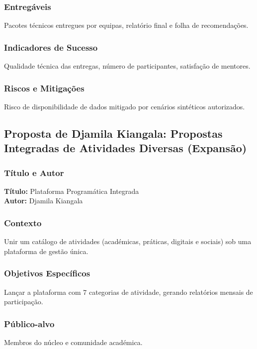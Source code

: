 \documentclass[12pt,a4paper]{article}
\begin{document}
\subsubsection*{Entregáveis}
Pacotes técnicos entregues por equipas, relatório final e folha de recomendações.

\subsubsection*{Indicadores de Sucesso}
Qualidade técnica das entregas, número de participantes, satisfação de mentores.

\subsubsection*{Riscos e Mitigações}
Risco de disponibilidade de dados mitigado por cenários sintéticos autorizados.

\subsection{Proposta de Djamila Kiangala: Propostas Integradas de Atividades Diversas (Expansão)}

\subsubsection*{Título e Autor}
\textbf{Título:} Plataforma Programática Integrada \\
\textbf{Autor:} Djamila Kiangala

\subsubsection*{Contexto}
Unir um catálogo de atividades (académicas, práticas, digitais e sociais) sob uma plataforma de gestão única.

\subsubsection*{Objetivos Específicos}
Lançar a plataforma com 7 categorias de atividade, gerando relatórios mensais de participação.

\subsubsection*{Público-alvo}
Membros do núcleo e comunidade académica.
\end{document}
